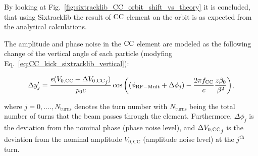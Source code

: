 
By looking at Fig.~\ref{fig:sixtracklib_CC_orbit_shift_vs_theory} it is concluded, that using Sixtracklib the result of ${\mathrm{CC}}$ element on the orbit is as expected from the analytical calculations. %

The amplitude and phase noise in the ${\mathrm{CC}}$ element are modeled as the following change of the vertical angle of each particle (modyfing Eq.~\eqref{eq:CC_kick_sixtracklib_vertical}):



\begin{equation}\label{eq:CC_kick_sixtracklib_vertical_noise}
    \Delta y^\prime_{j} =\frac{ e( {V_\mathrm{0, CC}} + \Delta {V_\mathrm{0, CC}}_j)}{p_0 c}  \cos{\left ( \left (\phi_\mathrm{RF-Mult} + \Delta \phi_j  \right ) - \frac{2\pi f_\mathrm{CC}}{c} \frac{z \beta_0}{\beta^2} \right )} ,
\end{equation}

where $j={0, ...., N_\mathrm{turns}}$ denotes the turn number with $N_\mathrm{turns}$ being the total number of turns that the beam passes through the element. Furthermore, $\Delta \phi_j$ is the deviation from the nominal phase (phase noise level), and $\Delta {V_\mathrm{0, CC}}_j$ is the deviation from the nominal amplitude $V_\mathrm{0,CC}$ (amplitude noise level) at the $j^\mathrm{th}$ turn.

